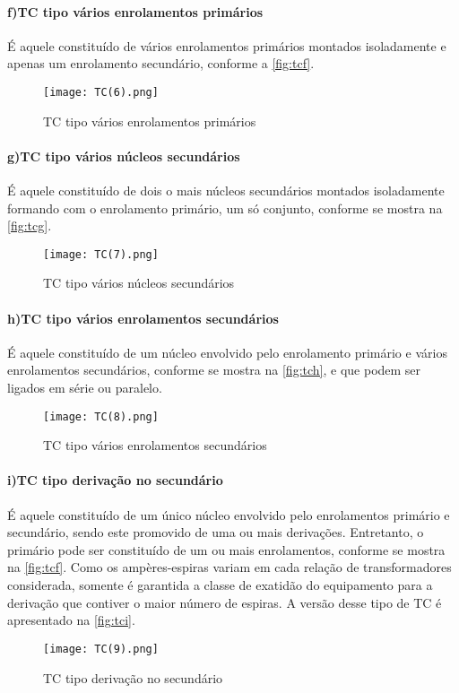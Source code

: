 				\paragraph*{f)\indent TC tipo vários enrolamentos primários}
					É aquele constituído de vários enrolamentos primários montados isoladamente e apenas um enrolamento secundário, conforme a \autoref{fig:tcf}.
					\begin{figure}[htb]
						\caption{TC tipo vários enrolamentos primários}
						\centering
						\texttt{[image: TC(6).png]}
						\label{fig:tcf}
					\end{figure}
				\paragraph*{g)\indent TC tipo vários núcleos secundários}
					É aquele constituído de dois o mais núcleos secundários montados isoladamente formando com o enrolamento primário, um só conjunto, conforme se mostra na \autoref{fig:tcg}.
					\begin{figure}[htb]
						\caption{TC tipo vários núcleos secundários}
						\centering
						\texttt{[image: TC(7).png]}
						\label{fig:tcg}
					\end{figure}
				\paragraph*{h)\indent TC tipo vários enrolamentos secundários}
					É aquele constituído de um núcleo envolvido pelo enrolamento primário e vários enrolamentos secundários, conforme se mostra na \autoref{fig:tch}, e que podem ser ligados em série ou paralelo.
					\begin{figure}[htb]
						\caption{TC tipo vários enrolamentos secundários}
						\centering
						\texttt{[image: TC(8).png]}
						\label{fig:tch}
					\end{figure}
				\paragraph*{i)\indent TC tipo derivação no secundário}
					É aquele constituído de um único núcleo envolvido pelo enrolamentos primário e secundário, sendo este promovido de uma ou mais derivações. Entretanto, o primário pode ser constituído de um ou mais enrolamentos, conforme se mostra na \autoref{fig:tcf}. Como os ampères-espiras variam em cada relação de transformadores considerada, somente é garantida a classe de  exatidão do equipamento para a derivação que contiver o maior número de espiras. A versão desse tipo de TC é apresentado na \autoref{fig:tci}.  
					\begin{figure}[htb]
						\caption{TC tipo derivação no secundário}
						\centering
						\texttt{[image: TC(9).png]}
						\label{fig:tci}
					\end{figure}
